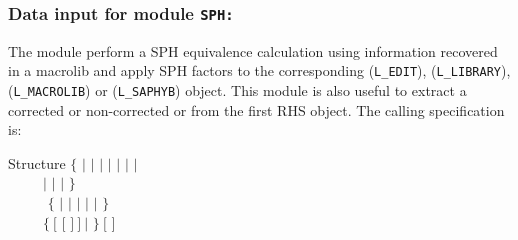 \subsubsection{Data input for module {\tt SPH:}}

The  module perform a SPH equivalence calculation using
information recovered in a macrolib and apply SPH factors to the corresponding  ({\tt L\_EDIT}),
 ({\tt L\_LIBRARY}),  ({\tt L\_MACROLIB}) or  ({\tt L\_SAPHYB}) object. This module is also useful
to extract a corrected or non-corrected  or  from the first RHS object. The calling specification is:

\begin{DataStructure}{Structure }
$\{$  $|$  $|$  $|$  $|$  $|$  $|$  $|$  \\
~~~~~$|$  $|$  $|$  $\}$ \\
~~~~~\moc{:=}  $\{$  $|$ 
$|$  $|$  $|$  $|$  $\}$ \\
~~~~~$\{~[$  $[$  $]~]~|$  $\}~[$  $]$ \\
~~~~~\moc{::} 
\end{DataStructure}

